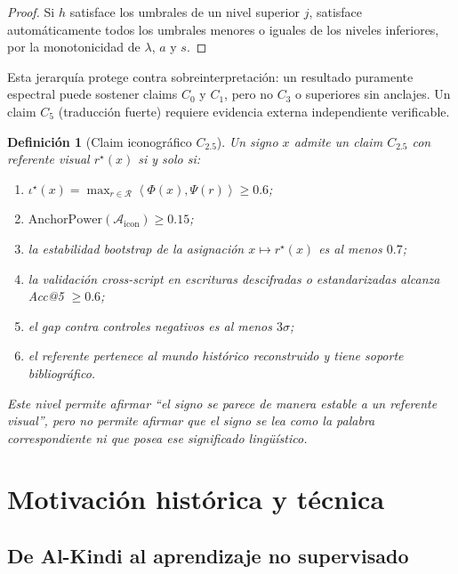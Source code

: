 \documentclass[11pt,a4paper]{article}
\newtheorem{definition}[theorem]{Definición}
\newcommand{\1}{\mathbf{1}}
\newcommand{\inner}[2]{\left\langle #1,#2 \right\rangle}
\numberwithin{equation}{section}
\begin{document}
\begin{proof}
Si $h$ satisface los umbrales de un nivel superior $j$, satisface automáticamente todos los umbrales menores o iguales de los niveles inferiores, por la monotonicidad de $\lambda$, $a$ y $s$.
\end{proof}

Esta jerarquía protege contra sobreinterpretación: un resultado puramente espectral puede sostener claims $C_0$ y $C_1$, pero no $C_3$ o superiores sin anclajes. Un claim $C_5$ (traducción fuerte) requiere evidencia externa independiente verificable.

\begin{definition}[Claim iconográfico $C_{2.5}$]
\label{def:c25}
Un signo $x$ admite un claim $C_{2.5}$ con referente visual $r^\star(x)$ si y solo si:
\begin{enumerate}[label=(\roman*)]
    \item $\iota^\star(x)=\max_{r\in\mathcal{R}}\inner{\Phi(x)}{\Psi(r)}\geq 0.6$;
    \item $\mathrm{AnchorPower}(\mathcal{A}_{\mathrm{icon}})\geq 0.15$;
    \item la estabilidad bootstrap de la asignación $x\mapsto r^\star(x)$ es al menos $0.7$;
    \item la validación cross-script en escrituras descifradas o estandarizadas alcanza Acc@5 $\geq 0.6$;
    \item el gap contra controles negativos es al menos $3\sigma$;
    \item el referente pertenece al mundo histórico reconstruido y tiene soporte bibliográfico.
\end{enumerate}
Este nivel permite afirmar ``el signo se parece de manera estable a un referente visual'', pero \emph{no} permite afirmar que el signo se lea como la palabra correspondiente ni que posea ese significado lingüístico.
\end{definition}

\section{Motivación histórica y técnica}

\subsection{De Al-Kindi al aprendizaje no supervisado}
\end{document}
